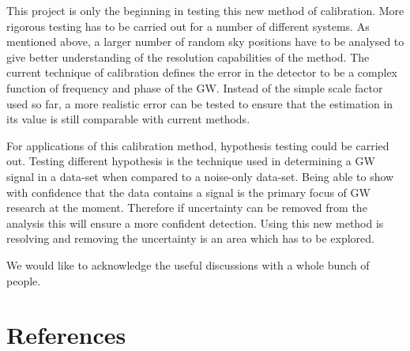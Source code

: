 \documentclass[12pt]{iopart}
\begin{document}
This project is only the beginning in testing this new method of calibration.
More rigorous testing has to be carried out for a number of different systems.
As mentioned above, a larger number of random sky positions have to be analysed
to give better understanding of the resolution capabilities of the method. The
current technique of calibration defines the error in the detector to be a
complex function of frequency and phase of the GW. Instead of the simple scale
factor used so far, a more realistic error can be tested to ensure that the
estimation in its value is still comparable with current methods.


For applications of this calibration method, hypothesis testing could be
carried out. Testing different hypothesis is the technique used in determining
a GW signal in a data-set when compared to a noise-only data-set. Being able to
show with confidence that the data contains a signal is the primary focus of GW
research at the moment. Therefore if uncertainty can be removed from the
analysis this will ensure a more confident detection. Using this new method is
resolving and removing the uncertainty is an area which has to be explored.

\ack

We would like to acknowledge the useful discussions with a whole bunch
of people.

\section*{References}



\end{document}
